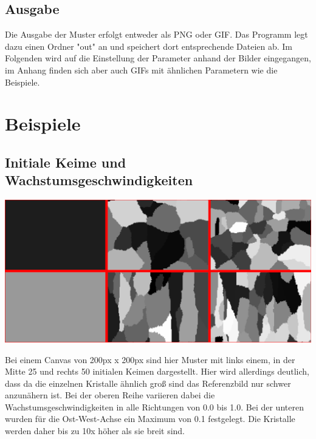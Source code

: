 \documentclass[a4paper,10pt,ngerman]{scrartcl}
\begin{document}
\subsection{Ausgabe}
Die Ausgabe der Muster erfolgt entweder als PNG oder GIF. Das Programm legt dazu einen Ordner "out" an und speichert dort entsprechende Dateien ab. Im Folgenden wird auf die Einstellung der Parameter anhand der Bilder eingegangen, im Anhang finden sich aber auch GIFs mit ähnlichen Parametern wie die Beispiele.


\section{Beispiele}
\subsection{Initiale Keime und Wachstumsgeschwindigkeiten}
\centerline{\includegraphics{collage2}}
Bei einem Canvas von 200px x 200px sind hier Muster mit links einem, in der Mitte 25 und rechts 50 initialen Keimen dargestellt. Hier wird allerdings deutlich, dass da die einzelnen Kristalle ähnlich groß sind das Referenzbild nur schwer anzunähern ist.
Bei der oberen Reihe variieren dabei die Wachstumsgeschwindigkeiten in alle Richtungen von 0.0 bis 1.0. Bei der unteren wurden für die Ost-West-Achse ein Maximum von 0.1 festgelegt. Die Kristalle werden daher bis zu 10x höher als sie breit sind.
\end{document}
